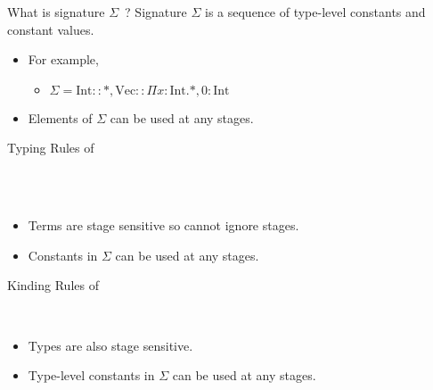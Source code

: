 \documentclass[dvipdfmx,aspectratio=169, 20pt]{beamer}
\begin{document}
\begin{frame}[fragile]{What is signature \( \Sigma \)\ ?}
    Signature \( \Sigma \) is a sequence of type-level constants and constant values.
    \begin{itemize}
        \item For example,
            \begin{itemize}
                \item \( \Sigma = \text{Int}::*, \text{Vec}::\Pi x:\text{Int}.*, 0:\text{Int} \)
            \end{itemize}
        \item Elements of \( \Sigma \) can be used at any stages.
    \end{itemize}
\end{frame}

\begin{frame}[fragile]{Typing Rules of \LMD}
    \begin{center}
         \\[2mm]
         \\[2mm]
    \end{center}
    \begin{itemize}
        \item Terms are stage sensitive so cannot ignore stages.
        \item Constants in \( \Sigma \) can be used at any stages.
    \end{itemize}
\end{frame}

\begin{frame}[fragile]{Kinding Rules of \LMD}
    \begin{center}
        \\[2mm]
    \end{center}
    \begin{itemize}
        \item Types are also stage sensitive.
        \item Type-level constants in \( \Sigma \) can be used at any stages.
    \end{itemize}
\end{frame}
\end{document}
